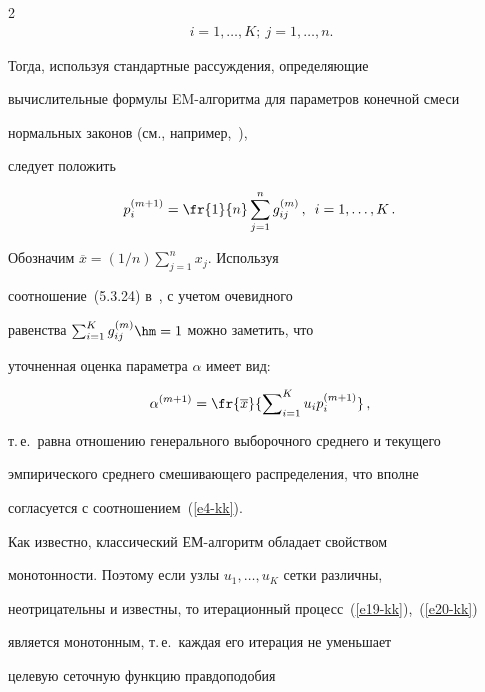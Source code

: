\begin{multicols}{2}
\begin{align*}
\  i=1,\ldots,K;\ j=1,\ldots,n.


\end{align*}


Тогда, используя стандартные рассуждения, определяющие


вычислительные формулы EM-ал\-го\-рит\-ма для параметров конечной смеси


нормальных законов (см., например,~\cite[разд.~5.3.7--5.3.8]{Korolev2011-2}), 


следует положить


\begin{equation}


p_i^{(m+1)}=\fr{1}{n}\sum\limits_{j=1}^ng_{ij}^{(m)}\,, \enskip


i=1,\ldots,K\,.\label{e19-kk}


\end{equation}


Обозначим $\overline{x}=(1/n)\sum\nolimits_{j=1}^nx_j$. Используя


соотношение~(5.3.24) в~\cite{Korolev2011-2}, с учетом очевидного


равенства $\sum\nolimits_{i=1}^Kg_{ij}^{(m)}\hm=1$ можно заметить, что


уточненная оценка параметра $\alpha$ имеет вид:


\begin{equation}


\alpha^{(m+1)}=\fr{\overline{x}}{\sum\nolimits_{i=1}^Ku_ip_i^{(m+1)}}\,,


\label{e20-kk}


\end{equation}


т.\,е.\ равна отношению генерального выборочного среднего и текущего


эмпирического среднего смешивающего распределения, что вполне


согласуется с соотношением~(\ref{e4-kk}).





Как известно, классический ЕМ-ал\-го\-ритм обладает свойством


монотонности. Поэтому если узлы $u_1,\ldots,u_K$ сетки различны,


неотрицательны и известны, то итерационный процесс~(\ref{e19-kk}),~(\ref{e20-kk})


является монотонным, т.\,е.\ каждая его итерация не уменьшает


целевую сеточную функцию правдоподобия






\end{multicols}
